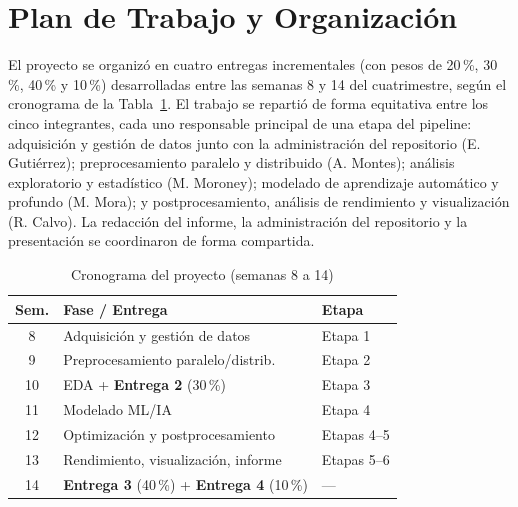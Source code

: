 \documentclass[conference]{IEEEtran}
\begin{document}
\section{Plan de Trabajo y Organización}
\label{sec:plan}
El proyecto se organizó en cuatro entregas incrementales (con pesos de 20\,\%, 30\,\%, 40\,\% y 10\,\%) desarrolladas entre las semanas 8 y 14 del cuatrimestre, según el cronograma de la Tabla~\ref{tab:cronograma}. El trabajo se repartió de forma equitativa entre los cinco integrantes, cada uno responsable principal de una etapa del pipeline: adquisición y gestión de datos junto con la administración del repositorio (E. Gutiérrez); preprocesamiento paralelo y distribuido (A. Montes); análisis exploratorio y estadístico (M. Moroney); modelado de aprendizaje automático y profundo (M. Mora); y postprocesamiento, análisis de rendimiento y visualización (R. Calvo). La redacción del informe, la administración del repositorio y la presentación se coordinaron de forma compartida.

\begin{table}[tb]
\caption{Cronograma del proyecto (semanas 8 a 14)}
\label{tab:cronograma}
\centering
\renewcommand{\arraystretch}{1.2}
\begin{tabular}{c l l}
\toprule
\textbf{Sem.} & \textbf{Fase / Entrega} & \textbf{Etapa} \\
\midrule
8  & Adquisición y gestión de datos & Etapa 1 \\
9  & Preprocesamiento paralelo/distrib. & Etapa 2 \\
10 & EDA + \textbf{Entrega 2} (30\,\%) & Etapa 3 \\
11 & Modelado ML/IA & Etapa 4 \\
12 & Optimización y postprocesamiento & Etapas 4--5 \\
13 & Rendimiento, visualización, informe & Etapas 5--6 \\
14 & \textbf{Entrega 3} (40\,\%) + \textbf{Entrega 4} (10\,\%) & --- \\
\bottomrule
\end{tabular}
\end{table}

\end{document}
